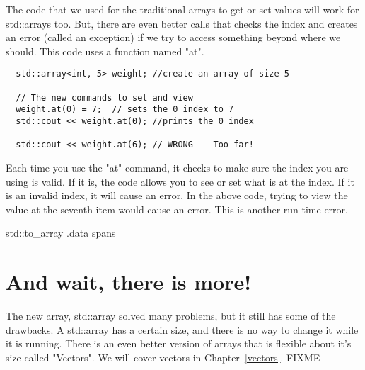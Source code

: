 The code that we used for the traditional arrays to get
or set values will work for std::arrays too. But, there
are even better calls that checks the index and creates
an error (called an exception) if we try to access something
beyond where we should. This code uses a function named "at".
\begin{lstlisting}
  std::array<int, 5> weight; //create an array of size 5

  // The new commands to set and view
  weight.at(0) = 7;  // sets the 0 index to 7
  std::cout << weight.at(0); //prints the 0 index
  
  std::cout << weight.at(6); // WRONG -- Too far! 
\end{lstlisting}
Each time you use the "at" command, it checks to make sure the index you are using is valid. If it is, the code allows you to see or set what is at the index. If it is an invalid index, it will cause an error. In the above code, trying to view the value at the seventh item would cause an
error. This is another run time error. 

std::to\_array
.data
spans
\section{And wait, there is more!}
The new array, std::array solved many problems, but it
still has some of the drawbacks. A std::array has a certain 
size, and there is no way to change it while it is running. There is an even better version of arrays that is flexible about it's size called "Vectors". We will cover vectors in Chapter~\ref{vectors}.
FIXME